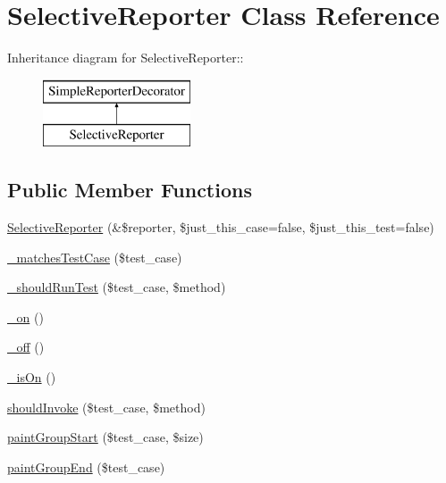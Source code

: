 \hypertarget{class_selective_reporter}{
\section{SelectiveReporter Class Reference}
\label{class_selective_reporter}
}
Inheritance diagram for SelectiveReporter::\begin{figure}[H]
\begin{center}
\leavevmode
\includegraphics[height=2cm]{class_selective_reporter}
\end{center}
\end{figure}
\subsection*{Public Member Functions}
\begin{DoxyCompactItemize}
\item 
\hyperlink{class_selective_reporter_af10c55382508bba90e9a7c1c2e88a695}{SelectiveReporter} (\&\$reporter, \$just\_\-this\_\-case=false, \$just\_\-this\_\-test=false)
\item 
\hyperlink{class_selective_reporter_af2344a42987b67d671c8e02a91c5b4fd}{\_\-matchesTestCase} (\$test\_\-case)
\item 
\hyperlink{class_selective_reporter_aec4a64bdd3c2531229d6c0f34aa78f03}{\_\-shouldRunTest} (\$test\_\-case, \$method)
\item 
\hyperlink{class_selective_reporter_aa09eb9deff7a2fcd6f35cb441b4458cb}{\_\-on} ()
\item 
\hyperlink{class_selective_reporter_a2e55fad83e680bd660ab309b86d72d88}{\_\-off} ()
\item 
\hyperlink{class_selective_reporter_a84b7ad4af2744887f8f60e504a027647}{\_\-isOn} ()
\item 
\hyperlink{class_selective_reporter_a33b86430bc37e8c5f35c246789a9a105}{shouldInvoke} (\$test\_\-case, \$method)
\item 
\hyperlink{class_selective_reporter_af83e76607ce4fed137722eadc77549ff}{paintGroupStart} (\$test\_\-case, \$size)
\item 
\hyperlink{class_selective_reporter_a3d49dee3f9831508049c46b3f8bc48e1}{paintGroupEnd} (\$test\_\-case)
\end{DoxyCompactItemize}
